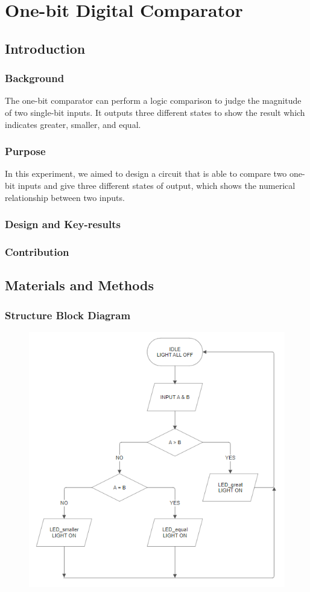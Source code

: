 \section{One-bit Digital Comparator}
\subsection{Introduction}%
    \subsubsection{Background}
    The one-bit comparator can perform a logic comparison to judge the magnitude of 
    two single-bit inputs. 
    It outputs three different states to show the result 
    which indicates greater, smaller, and equal.
    \subsubsection{Purpose}
    In this experiment, we aimed to design a circuit that is able to compare two one-bit inputs and give three different states of output, which shows the numerical relationship between two inputs.
    \subsubsection{Design and Key-results}
    \subsubsection{Contribution}

\subsection{Materials and Methods}%
    \subsubsection{Structure Block Diagram}
    \begin{figure}[h]
        \centering
        \includegraphics[width=0.8\linewidth]{Structure_Block_Diagram/onebitcomparator_BlockStructureDiagram.png}
        \label{obc_SBD}
    \end{figure}
    \FloatBarrier
